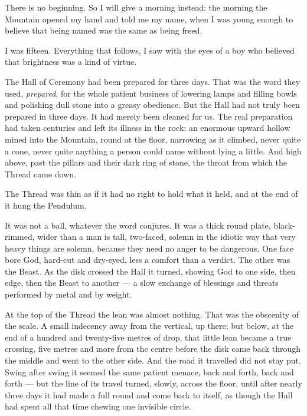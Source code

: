 
There is no beginning.  
So I will give a morning instead: the morning the Mountain opened my hand and told me my name, when I was young enough to believe that being named was the same as being freed.\par

I was fifteen. 
Everything that follows, I saw with the eyes of a boy who believed that brightness was a kind of virtue.\par

\ornament

The Hall of Ceremony had been prepared for three days. 
That was the word they used, \textit{prepared}, for the whole patient business of lowering lamps and filling bowls and polishing dull stone into a greasy obedience. 
But the Hall had not truly been prepared in three days. 
It had merely been cleaned for us. 
The real preparation had taken centuries and left its illness in the rock: an enormous upward hollow mined into the Mountain, 
round at the floor, narrowing as it climbed, never quite a cone, never quite anything a person could name without lying a little. 
And high above, past the pillars and their dark ring of stone, the throat from which the Thread came down.\par

The Thread was thin as if it had no right to hold what it held, and at the end of it hung the Pendulum.\par

It was not a ball, whatever the word conjures. 
It was a thick round plate, black-rimmed, wider than a man is tall, two-faced, solemn in the idiotic way that very heavy things are solemn, 
because they need no anger to be dangerous. One face bore God, hard-cut and dry-eyed, less a comfort than a verdict. 
The other was the Beast. As the disk crossed the Hall it turned, showing God to one side, then edge, 
then the Beast to another --- a slow exchange of blessings and threats performed by metal and by weight.\par

At the top of the Thread the lean was almost nothing. 
That was the obscenity of the scale. 
A small indecency away from the vertical, up there; but below, at the end of a hundred and twenty-five metres of drop, that little lean became a true crossing, 
five metres and more from the centre before the disk came back through the middle and went to the other side. 
And the road it travelled did not stay put. 
Swing after swing it seemed the same patient menace, back and forth, back and forth --- but the line of its travel turned, slowly, across the floor, 
until after nearly three days it had made a full round and come back to itself, as though the Hall had spent all that time chewing one invisible circle.\par

